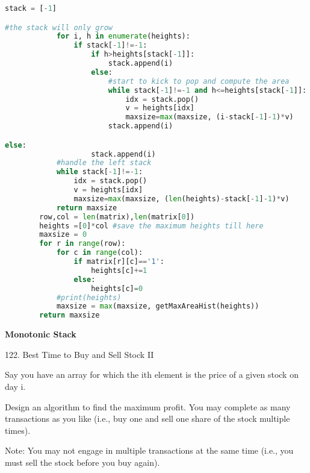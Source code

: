 \documentclass[../main.tex]{subfiles}
\begin{document}
\begin{examples}[resume]
\begin{lstlisting}[language = Python]
stack = [-1]

#the stack will only grow
            for i, h in enumerate(heights):
                if stack[-1]!=-1:
                    if h>heights[stack[-1]]:
                        stack.append(i)
                    else:
                        #start to kick to pop and compute the area
                        while stack[-1]!=-1 and h<=heights[stack[-1]]: #same or equal needs to be pop out
                            idx = stack.pop()
                            v = heights[idx]
                            maxsize=max(maxsize, (i-stack[-1]-1)*v)
                        stack.append(i)

else:
                    stack.append(i)
            #handle the left stack
            while stack[-1]!=-1:
                idx = stack.pop()
                v = heights[idx]
                maxsize=max(maxsize, (len(heights)-stack[-1]-1)*v)
            return maxsize
        row,col = len(matrix),len(matrix[0])
        heights =[0]*col #save the maximum heights till here
        maxsize = 0
        for r in range(row):
            for c in range(col):
                if matrix[r][c]=='1':
                    heights[c]+=1
                else:
                    heights[c]=0
            #print(heights)
            maxsize = max(maxsize, getMaxAreaHist(heights))
        return maxsize
\end{lstlisting}

\textbf{Monotonic Stack}

122. Best Time to Buy and Sell Stock II

Say you have an array for which the ith element is the price of a given stock on day i.

Design an algorithm to find the maximum profit. You may complete as many transactions as you like (i.e., buy one and sell one share of the stock multiple times).

Note: You may not engage in multiple transactions at the same time (i.e., you must sell the stock before you buy again).


\end{examples}
\end{document}
